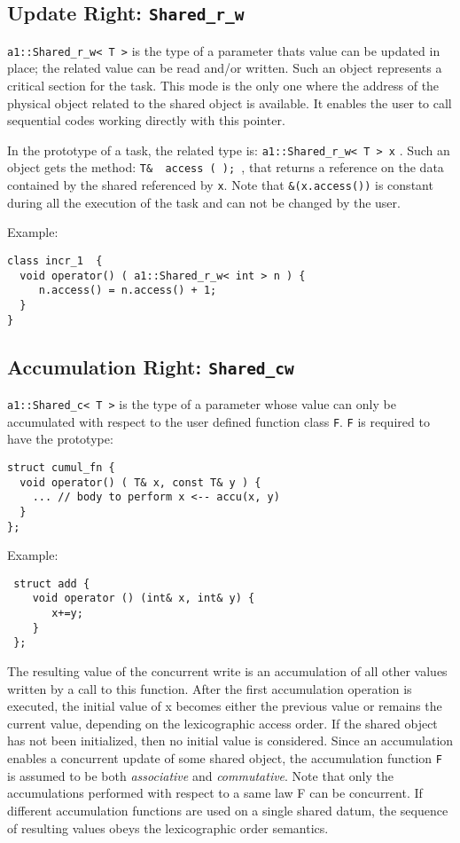 \subsection{Update Right: \texttt{Shared\_r\_w} }
\verb+a1::Shared_r_w< T >+ is the type of a parameter thats value
can be updated in place;
the related value  can be read
  and/or written. Such an object represents a critical section for the task.
This
  mode is the only one where the address of the physical object related to the
  shared object is available. It enables the user to call sequential codes
  working directly with this pointer.

 In the prototype of a task, the related type is:
 { \verb+a1::Shared_r_w< T > x+ }.
 Such an object gets the method: 
 { \verb+T&  access ( ); +}, 
that returns a reference on the data contained by
  the shared referenced by \verb!x!.  Note that \verb!&(x.access())!
  is constant during all the execution of the task and can not be
  changed by the user.

Example:
\begin{boxit}
\begin{verbatim}
class incr_1  {
  void operator() ( a1::Shared_r_w< int > n ) {
     n.access() = n.access() + 1;
  }
}
\end{verbatim}
\end{boxit}


\subsection{Accumulation Right: \texttt{Shared\_cw}  }
\verb+a1::Shared_c< T >+ is the type of a parameter whose value
can only be accumulated with respect to the user defined function class
\verb+F+.
\verb+F+ is required to have the prototype:
\begin{verbatim}
struct cumul_fn {
  void operator() ( T& x, const T& y ) {
    ... // body to perform x <-- accu(x, y)
  }
};
\end{verbatim}
Example:
\begin{boxit}
\begin{verbatim}
 struct add {
    void operator () (int& x, int& y) {
       x+=y;
    }
 };
\end{verbatim}
\end{boxit}

The resulting value of the concurrent write is an accumulation of all other values 
written by a call to this function. After the first accumulation operation is executed, 
the initial value of x becomes either the previous value or remains the current value, 
depending on the lexicographic access order. If the shared object has not been initialized, 
then no initial value is considered. Since an accumulation enables a concurrent update of 
some shared object, the accumulation function \verb+F+ is assumed to be both \emph{associative} and \emph{commutative}.
  Note that only the accumulations performed with respect to a same law F can 
be concurrent.  If different accumulation functions are used on a single shared datum, 
the sequence of resulting values obeys the lexicographic order semantics. 


